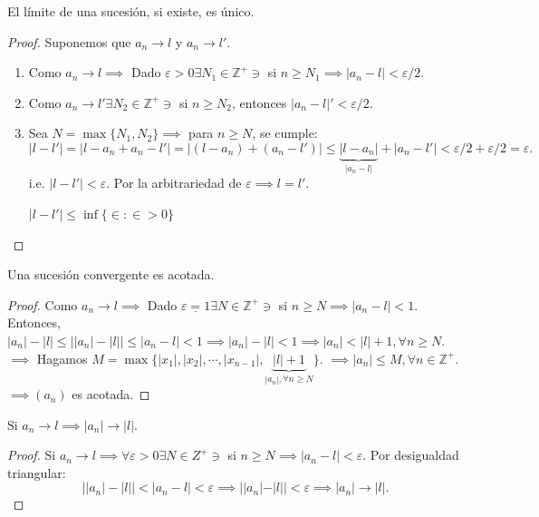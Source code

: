 \begin{teorema}
	El límite de una sucesión, si existe, es único. 
\end{teorema}
\begin{proof}
	Suponemos que $a_n\to l$ y $a_n\to l'$. 
	\begin{enumerate}
		\item Como $a_n\to l\implies$ Dado $\varepsilon >0\exists N_1\in \mathbb{Z}^+\ni$ si $n\geq N_1\implies |a_n-l|<\varepsilon/2$. 
		\item Como $a_n\to l'\exists N_2\in \mathbb{Z}^+\ni$ si $n\geq N_2$, entonces $|a_n-l|'<\varepsilon/2$.
		\item Sea $N=\max\{N_1,N_2\}\implies$ para $n\geq N$, se cumple: 
		$$|l-l'|=|l-a_n+a_n-l'|=|(l-a_n)+(a_n-l')|\leq \underbrace{|l-a_n|}_{|a_n-l|}+|a_n-l'|<\varepsilon/2+\varepsilon/2=\varepsilon.$$
		i.e. $|l-l'|<\varepsilon$. Por la arbitrariedad de $\varepsilon \implies l=l'$. 
		\begin{cajita}
			$|l-l'|\leq \inf\{\in: \in >0\}$
		\end{cajita}
	\end{enumerate}
\end{proof}

\begin{teorema}
	Una sucesión convergente es acotada. 
\end{teorema}
\begin{proof}
	Como $a_n\to l\implies$ Dado $\underline{\varepsilon=1}\exists N\in\mathbb{Z}^+\ni$ si $n\geq N\implies |a_n-l|<1$. Entonces, $|a_n|-|l|\leq \left||a_n|-|l|\right|\leq |a_n-l|<1\implies |a_n|-|l|<1\implies |a_n|<|l|+1, \forall n\geq N$. $\implies$ Hagamos $M=\max\{|x_1|,|x_2|,\cdots, |x_{n-1}|, \underbrace{|l|+1}_{|a_n|, \forall n\geq N}\}$. $\implies |a_n|\leq M, \forall n\in \mathbb{Z}^+$. $\implies (a_n)$ es acotada. 
\end{proof}

\begin{teorema}
	Si $a_n\to l\implies |a_n|\to|l|$. 
\end{teorema}

\begin{proof}
	Si $a_n\to l\implies \forall \varepsilon >0\exists N\in Z^+\ni$ si $n\geq N\implies |a_n-l|<\varepsilon$. Por desigualdad triangular: $$\left||a_n|-|l|\right|<|a_n-l|<\varepsilon\implies ||a_n|-|l||<\varepsilon\implies |a_n|\to|l|.$$
\end{proof}

